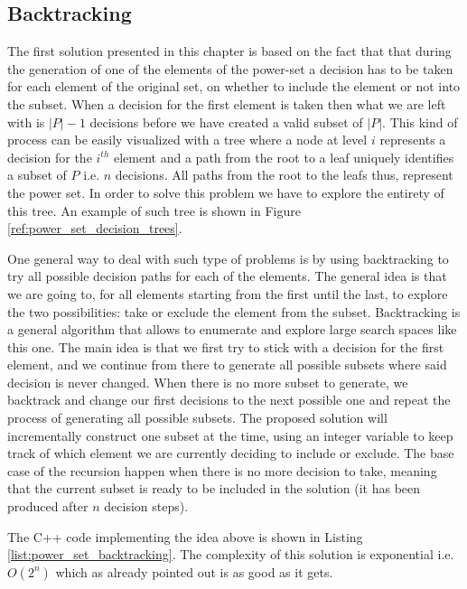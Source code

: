 \subsection{Backtracking}
The first solution presented in this chapter is based on the fact that that during the generation of
one of the elements of the power-set a decision has to be taken for each element of the original
set, on whether to include the element or not into the subset. When a decision for the first element
is taken then what we are left with is $|P|-1$ decisions before we have created a valid subset of
$|P|$. 
This kind of process can be easily visualized with a tree where a node at level $i$
represents a decision for the $i^{th}$ element and a path from the root to a leaf uniquely
identifies a subset of $P$ i.e. $n$ decisions. 
All paths from the root to the leafs thus, represent the power set. In
order to solve this problem we have to explore the entirety of this tree. An example of such tree is
shown in Figure \ref{ref:power_set_decision_trees}.

One general way to deal with such type of problems is by using backtracking to try all possible
decision paths for each of the elements. The general idea is that we are going to, for all elements
starting from the first until the last, to explore the two possibilities: take or exclude the
element from the subset. Backtracking is a general algorithm that allows to enumerate and explore
large search spaces like this one. The main idea is that we first try to stick with a decision for
the first element, and we continue from there to generate all possible subsets where said decision
is never changed. When there is no more subset to generate, we backtrack and change our first
decisions to the next possible one and repeat the process of generating all possible subsets.
The proposed solution will incrementally construct one subset at the time, using an integer variable
to keep track of which element we are currently
deciding to include or exclude. The base case of the recursion happen when there is no more decision
to take, meaning that the current subset is ready to be included in the solution (it has been
produced after $n$ decision steps).

The C++ code implementing the idea above is shown in Listing \ref{list:power_set_backtracking}. The
complexity of this solution is exponential i.e. $O(2^n)$ which as already pointed out is as good as
it gets.



